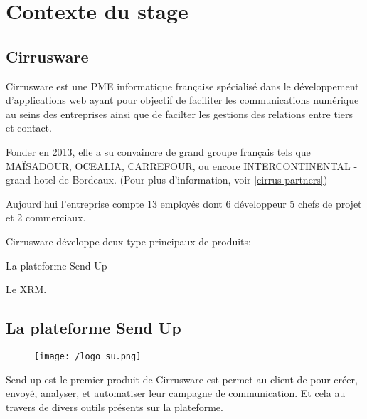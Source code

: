 \section{Contexte du stage}
\subsection{Cirrusware}
Cirrusware est une PME informatique française spécialisé dans le développement d'applications web ayant pour objectif de faciliter les communications numérique au seins des entreprises ainsi que de facilter les gestions des relations entre tiers et contact. 

Fonder en 2013, elle a su convaincre de grand groupe français tels que MAÏSADOUR, OCEALIA, CARREFOUR, ou encore INTERCONTINENTAL - grand hotel de Bordeaux. (Pour plus d'information, voir \ref{cirrus-partners}) 

Aujourd'hui l'entreprise compte 13 employés dont 6 développeur 5 chefs de projet et 2 commerciaux. 

Cirrusware développe deux type principaux de produits: 
\begin{list}{}{}
    \item La plateforme Send Up
    \item Le XRM. 
\end{list}

\subsection{La plateforme Send Up}
\begin{figure}[!h]
\centering
    \texttt{[image: /logo\_su.png]}

\end{figure}
Send up est le premier produit de Cirrusware est permet au client de pour créer, envoyé, analyser, et automatiser leur campagne de communication. Et cela au travers de divers outils présents sur la plateforme.  
